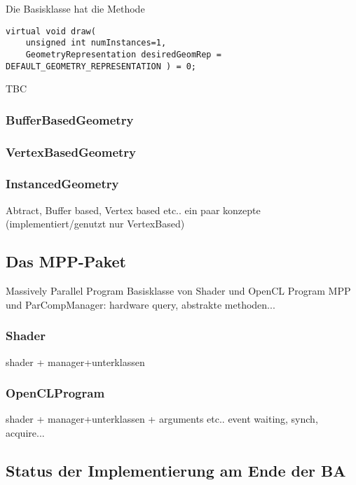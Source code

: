 	Die Basisklasse hat die Methode
	\begin{lstlisting}	
virtual void draw(
	unsigned int numInstances=1,
	GeometryRepresentation desiredGeomRep = DEFAULT_GEOMETRY_REPRESENTATION ) = 0;
	\end{lstlisting}
	
	TBC
	
	
	
	\subsubsection{BufferBasedGeometry}

	\subsubsection{VertexBasedGeometry}
	\label{sec:VertexBasedGeometry}
	
	\subsubsection{InstancedGeometry}
	
	
	
	Abtract, Buffer based, Vertex based etc.. ein paar konzepte (implementiert/genutzt nur VertexBased)  
		


\subsection{Das MPP-Paket}
Massively Parallel Program
	Basisklasse von Shader und OpenCL Program
	MPP und ParCompManager: hardware query, abstrakte methoden...
	\subsubsection{Shader}
		shader + manager+unterklassen
		
	\subsubsection{OpenCLProgram}
		shader + manager+unterklassen + arguments etc.. event waiting, synch, acquire...
		
		\label{sec:CLKernelArguments}





\subsection{Status der Implementierung am Ende der BA}
\label{sec:statusImplementation}
	

